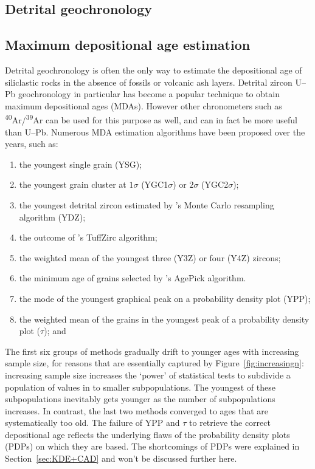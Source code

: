 \begin{refsection}


\chapter{Detrital geochronology}\label{ch:detrital}

\section{Maximum depositional age estimation}

Detrital geochronology is often the only way to estimate the
depositional age of siliclastic rocks in the absence of fossils or
volcanic ash layers. Detrital zircon U--Pb geochronology in particular
has become a popular technique to obtain maximum depositional ages
(MDAs). However other chronometers such as
\textsuperscript{40}Ar/\textsuperscript{39}Ar can be used for this
purpose as well, and can in fact be more useful than U--Pb. Numerous
MDA estimation algorithms have been proposed over the years, such as:

\begin{enumerate}
\item the youngest single grain (YSG);
\item the youngest grain cluster at $1\sigma$ (YGC1$\sigma$) or
  $2\sigma$ (YGC2$\sigma$);
\item the youngest detrital zircon estimated by \citet{ludwig2003}'s
  Monte Carlo resampling algorithm (YDZ);
\item the outcome of \citet{ludwig2002}'s TuffZirc algorithm;
\item the weighted mean of the youngest three (Y3Z) or four (Y4Z)
  zircons;
\item the minimum age of grains selected by \citet{gehrels2003}'s
  AgePick algorithm.
\item the mode of the youngest graphical peak on a probability density
  plot (YPP);
\item the weighted mean of the grains in the youngest peak of a
  probability density plot ($\tau$); and
\end{enumerate}

The first six groups of methods gradually drift to younger ages with
increasing sample size, for reasons that are essentially captured by
Figure~\ref{fig:increasingn}: increasing sample size increases the
`power' of statistical tests to subdivide a population of values in to
smaller subpopulations. The youngest of these subpopulations
inevitably gets younger as the number of subpopulations increases.  In
contrast, the last two methods converged to ages that are
systematically too old. The failure of YPP and $\tau$ to retrieve the
correct depositional age reflects the underlying flaws of the
probability density plots (PDPs) on which they are based. The
shortcomings of PDPs were explained in Section~\ref{sec:KDE+CAD} and
won't be discussed further here.\\


\end{refsection}
